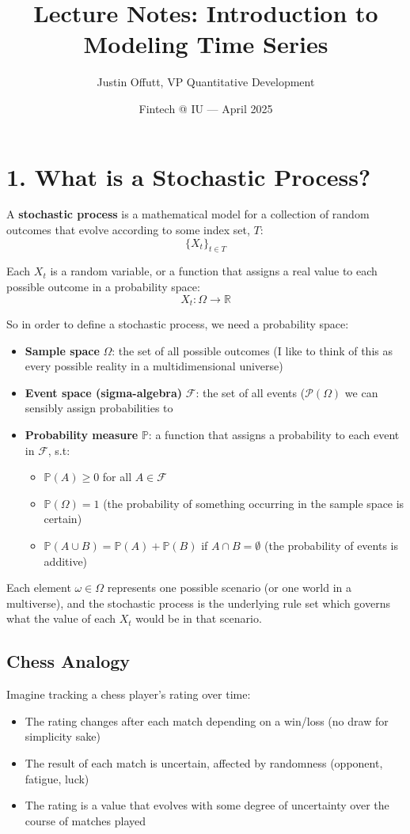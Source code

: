 \documentclass[10pt]{article}
\title{Lecture Notes: Introduction to Modeling Time Series}
\author{Justin Offutt, VP Quantitative Development}
\date{Fintech @ IU --- April 2025}
\begin{document}
	\maketitle
	
	\section*{1. What is a Stochastic Process?}
	
	A \textbf{stochastic process} is a mathematical model for a collection of random outcomes that evolve according to some index set, $T$:
	\[
	\{X_t\}_{t \in T}
	\]
	
	Each \( X_t \) is a random variable, or a function that assigns a real value to each possible outcome in a probability space:
	\[
	X_t : \Omega \to \mathbb{R}
	\]
	
	So in order to define a stochastic process, we need a probability space:
	\begin{itemize}
		\item \textbf{Sample space} \( \Omega \): the set of all possible outcomes (I like to think of this as every possible reality in a multidimensional universe)
		\item \textbf{Event space (sigma-algebra)} \( \mathcal{F} \): the set of all events ($\mathcal{P}(\Omega)$ we can sensibly assign probabilities to
		\item \textbf{Probability measure} \( \mathbb{P} \): a function that assigns a probability to each event in \( \mathcal{F} \), s.t:
		\begin{itemize}
			\item \( \mathbb{P}(A) \geq 0 \) for all \( A \in \mathcal{F} \)
			\item \( \mathbb{P}(\Omega) = 1 \) (the probability of something occurring in the sample space is certain)
			\item \( \mathbb{P}(A \cup B) = \mathbb{P}(A) + \mathbb{P}(B) \) if \( A \cap B = \emptyset \) (the probability of events is additive)
		\end{itemize}
	\end{itemize}
	
	Each element \( \omega \in \Omega \) represents one possible scenario (or one world in a multiverse), and the stochastic process is the underlying rule set which governs what the value of each \( X_t \) would be in that scenario.
	
	\subsection*{Chess Analogy}
	Imagine tracking a chess player's rating over time:
	\begin{itemize}
		\item The rating changes after each match depending on a win/loss (no draw for simplicity sake)
		\item The result of each match is uncertain, affected by randomness (opponent, fatigue, luck)
		\item The rating is a value that evolves with some degree of uncertainty over the course of matches played
	\end{itemize}
	
\end{document}
